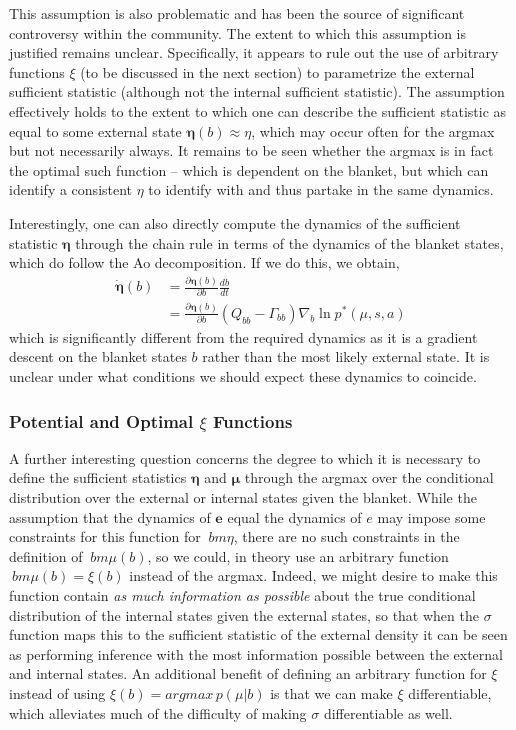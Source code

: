 This assumption is also problematic and has been the source of significant controversy within the community. The extent to which this assumption is justified remains unclear. Specifically, it appears to rule out the use of arbitrary functions $\xi$ (to be discussed in the next section) to parametrize the external sufficient statistic (although not the internal sufficient statistic). The assumption effectively holds to the extent to which one can describe the sufficient statistic as equal to some external state $\bm{\eta}(b) \approx \eta$, which may occur often for the argmax but not necessarily always. It remains to be seen whether the argmax is in fact the optimal such function -- which is dependent on the blanket, but which can identify a consistent $\eta$ to identify with and thus partake in the same dynamics.

Interestingly, one can also directly compute the dynamics of the sufficient statistic $\bm{\eta}$ through the chain rule in terms of the dynamics of the blanket states, which do follow the Ao decomposition. If we do this, we obtain,
\begin{align*}
  \dot{\bm{\eta}}(b) &= \frac{\partial \bm{\eta}(b)}{\partial b} \frac{db}{dt} \\
  &= \frac{\partial \bm{\eta}(b)}{\partial b} (Q_{bb} - \Gamma_{bb}) \nabla_b \ln p^*(\mu,s,a)
\end{align*}
which is significantly different from the required dynamics as it is a gradient descent on the blanket states $b$ rather than the most likely external state. It is unclear under what conditions we should expect these dynamics to coincide. 

\subsubsection{Potential and Optimal $\xi$ Functions}

A further interesting question concerns the degree to which it is necessary to define the sufficient statistics $\bm{\eta}$ and $\bm{\mu}$ through the argmax over the conditional distribution over the external or internal states given the blanket. While the assumption that the dynamics of $\mathbf{e}$ equal the dynamics of $e$ may impose some constraints for this function for $\ bm{\eta}$, there are no such constraints in the definition of $\ bm{\mu}(b)$, so we could, in theory use an arbitrary function $\ bm{\mu}(b) = \xi(b)$ instead of the argmax. Indeed, we might desire to make this function contain \emph{as much information as possible} about the true conditional distribution of the internal states given the external states, so that when the $\sigma$ function maps this to the sufficient statistic of the external density it can be seen as performing inference with the most information possible between the external and internal states. An additional benefit of defining an arbitrary function for $\xi$ instead of using $\xi(b) = argmax \, p(\mu| b)$ is that we can make $\xi$ differentiable, which alleviates much of the difficulty of making $\sigma$ differentiable as well.

